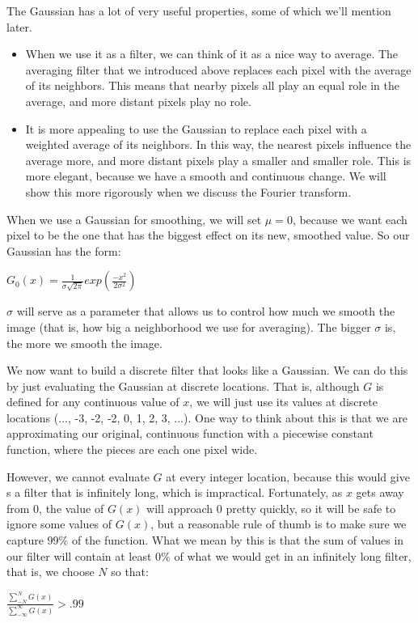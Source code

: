 \documentclass{report}
\begin{document}
The Gaussian has a lot of very useful properties, some of which we'll mention later. 
\begin{itemize}
    \item When we use it as a filter, we can think of it as a nice way to average. The averaging filter that we introduced above replaces each pixel with the average of its neighbors. This means that nearby pixels all play an equal role in the average, and more distant pixels play no role.
    \item It is more appealing to use the Gaussian to replace each pixel with a weighted average of its neighbors. In this way, the nearest pixels influence the average more, and more distant pixels play a smaller and smaller role. This is more elegant, because we have a smooth and continuous change. We will show this more rigorously when we discuss the Fourier transform.
\end{itemize}

When we use a Gaussian for smoothing, we will set $\mu=0$, because we want each pixel to be the one that has the biggest effect on its new, smoothed value. So our Gaussian has the form:\newline\newline
    \centerline{$G_0(x) = \frac{1}{\sigma \sqrt{2 \pi}} exp\left ( \frac{-x^2}{2\sigma^2} \right )$}

$\sigma$ will serve as a parameter that allows us to control how much we smooth the image (that is, how big a neighborhood we use for averaging). The bigger $\sigma$ is, the more we smooth the image.

We now want to build a discrete filter that looks like a Gaussian. We can do this by just evaluating the Gaussian at discrete locations. That is, although $G$ is defined for any continuous value of $x$, we will just use its values at discrete locations (..., -3, -2, -2, 0, 1, 2, 3, ...). One way to think about this is that we are approximating our original, continuous function with a piecewise constant function, where the pieces are each one pixel wide.

However, we cannot evaluate $G$ at every integer location, because this would give s a filter that is infinitely long, which is impractical. Fortunately, as $x$ gets away from 0, the value of $G(x)$ will approach 0 pretty quickly, so it will be safe to ignore some values of $G(x)$, but a reasonable rule of thumb is to make sure we capture $99\%$ of the function. What we mean by this is that the sum of values in our filter will contain at least $0\%$ of what we would get in an infinitely long filter, that is, we choose $N$ so that:\newline\newline
    \centerline{$\frac{\sum_{-N}^{N}G(x)}{\sum_{-\infty}^{\infty}G(x)} > .99$}
    
\end{document}
